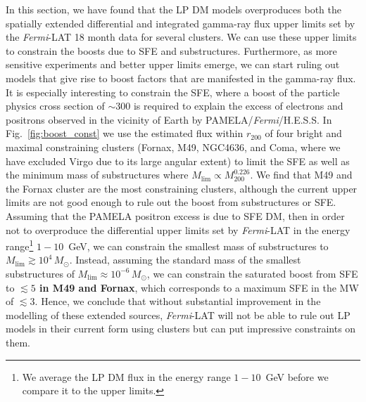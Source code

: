 \documentclass[10pt,aps,pra,reprint,amsmath,amsfonts,amssymb,showpacs,nofootinbib,floatfix]{revtex4-1}
\def\C#1{{\bf #1}}
\newcommand{\Fermi}{{\em Fermi}\xspace}
\newcommand{\rmn}{\mathrm}
\newcommand{\msun}{M_\odot}
\newcommand{\rvir}{r_{200}}
\newcommand{\mvir}{M_{200}}
\begin{document}
In this section, we have found that the LP DM models overproduces both
the spatially extended differential and integrated gamma-ray flux
upper limits set by the \Fermi-LAT 18 month data for several
clusters. We can use these upper limits to constrain the boosts due to
SFE and substructures. Furthermore, as more sensitive experiments and
better upper limits emerge, we can start ruling out models that give
rise to boost factors that are manifested in the gamma-ray flux. It is
especially interesting to constrain the SFE, where a boost of the
particle physics cross section of $\sim$300 is required to explain the
excess of electrons and positrons observed in the vicinity of Earth by
PAMELA/\Fermi/H.E.S.S. In Fig.~\ref{fig:boost_const} we use the
estimated flux within $\rvir$ of four bright and maximal constraining
clusters (Fornax, M49, NGC4636, and Coma, where we have excluded Virgo
due to its large angular extent) to limit the SFE as well as the
minimum mass of substructures where
$M_\rmn{lim}\propto\mvir^{0.226}$. We find that M49 and the Fornax
cluster are the most constraining clusters, although the current upper
limits are not good enough to rule out the boost from substructures or
SFE. Assuming that the PAMELA positron excess is due to SFE DM, then
in order not to overproduce the differential upper limits set by
\Fermi-LAT in the energy range\footnote{We average the LP DM flux in
  the energy range $1-10$~GeV before we compare it to the upper
  limits.}  $1-10$~GeV, we can constrain the smallest mass of
substructures to $M_\rmn{lim}\gtrsim 10^4\,\msun$. Instead, assuming
the standard mass of the smallest substructures of $M_\rmn{lim}\approx
10^{-6}\,\msun$, we can constrain the saturated boost from SFE to
\C{$\lesssim 5$ in M49 and Fornax}, which corresponds to a maximum SFE
in the MW of $\lesssim3$. Hence, we conclude that without substantial
improvement in the modelling of these extended sources, \Fermi-LAT
will not be able to rule out LP models in their current form using
clusters but can put impressive constraints on them.
\end{document}
